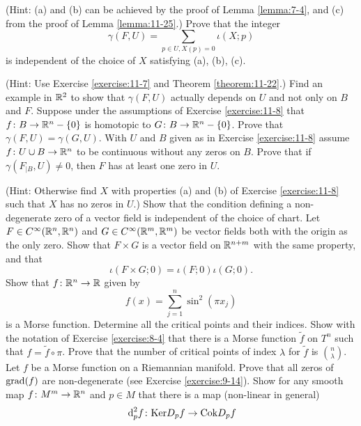 \begin{enumerate}[label=\theexercise.\arabic*.,ref=\theexercise.\arabic*,leftmargin=2.7em]
\begin{enumerate}
    \end{enumerate} \par(Hint: (a) and (b) can be achieved by the proof of Lemma \ref{lemma:7-4}, and (c) from the proof of Lemma \ref{lemma:11-25}.)
    Prove that the integer
    \[
      \gamma ( {F,U})  = \sum_{{p \in  U,X( p)  = 0}}\iota ( {X;p})
    \]
    is independent of the choice of $X$ satisfying (a), (b), (c).
    \par(Hint: Use Exercise \ref{exercise:11-7} and Theorem \ref{theorem:11-22}.)
    Find an example in ${\mathbb{R}}^{2}$ to show that $\gamma ( {F,U})$ actually depends on $U$ and not only on $B$ and $F$.
  \NewItem Suppose under the assumptions of Exercise \ref{exercise:11-8} that $f\colon B \rightarrow  {\ensuremath{\mathbb{R}}}^{n}- \{ 0\}$ is homotopic to $G\colon B \rightarrow  {\ensuremath{\mathbb{R}}}^{n}- \{ 0\}$. Prove that $\gamma ( {F,U})  = \gamma ( {G,U})$.
    \NewItem With $U$ and $B$ given as in Exercise \ref{exercise:11-8} assume $f\colon U \cup  B \rightarrow  {\ensuremath{\mathbb{R}}}^{n}$ to be continuous without any zeros on $B$. Prove that if $\gamma ( {{F}_{\mid B},U})  \neq  0$, then $F$ has at least one zero in $U$.
    \par(Hint: Otherwise find $X$ with properties (a) and (b) of Exercise \ref{exercise:11-8} such that $X$ has no zeros in $U$.)
  \NewItem Show that the condition defining a non-degenerate zero of a vector field is independent of the choice of chart.
  \NewItem Let $F \in  {C}^{\infty }( {{\mathbb{R}}^{n},{\mathbb{R}}^{n}})$ and $G \in  {C}^{\infty }( {{\mathbb{R}}^{m},{\mathbb{R}}^{m}})$ be vector fields both with the origin as the only zero. Show that $F \times  G$ is a vector field on ${\mathbb{R}}^{n + m}$ with the same property, and that
    \[
      \iota ( {F \times  G;0})  = \iota ( {F;0}) \iota ( {G;0}).
    \]
  \newchap[12]
  \NewItem Show that $f\colon {\ensuremath{\mathbb{R}}}^{n} \rightarrow  \mathbb{R}$ given by
    \[
      f( x)  = \sum_{{j = 1}}^{n}{\sin }^{2}( {\pi {x}_{j}})
    \]
    is a Morse function. Determine all the critical points and their indices. Show with the notation of Exercise \ref{exercise:8-4} that there is a Morse function $\tilde{f}$ on ${T}^{n}$ such that $f = \tilde{f} \circ  \pi$. Prove that the number of critical points of index $\lambda$ for $\tilde{f}$ is $\binom{n}{\lambda}$.
  \NewItem Let $f$ be a Morse function on a Riemannian manifold. Prove that all zeros of $\mathrm{grad}( f)$ are non-degenerate (see Exercise \ref{exercise:9-14}).
  \NewItem Show for any smooth map $f\colon {M}^{m} \rightarrow  {\ensuremath{\mathbb{R}}}^{n}$ and $p \in  M$ that there is a map (non-linear in general)
    \[
      {\dd}_{p}^{2}f\colon {\ker}{D}_{p}f \ra  {\cok}{D}_{p}f
    \]

\end{enumerate}
